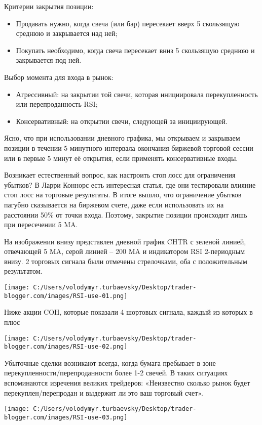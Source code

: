 \documentclass[a5paper]{article}
\begin{document}
Критерии закрытия позиции:
\begin{itemize}
\item     Продавать нужно, когда свеча (или бар) пересекает вверх 5 скользящую среднюю и закрывается над ней;
\item     Покупать необходимо, когда свеча пересекает вниз 5 скользящую среднюю и закрывается под ней.
\end{itemize}

Выбор момента для входа в рынок:
\begin{itemize}
\item     Агрессивный: на закрытии той свечи, которая инициировала перекупленность или перепроданность RSI;
\item     Консервативный: на открытии свечи, следующей за инициирующей.
\end{itemize}

Ясно, что при использовании дневного графика, мы открываем и закрываем позиции в течении 5 минутного интервала окончания биржевой торговой сессии или в первые 5 минут её открытия, если применять консервативные входы.

Возникает естественный вопрос, как настроить стоп лосс для ограничения убытков? В Ларри Коннорс есть интересная статья, где они тестировали влияние стоп лосс на торговые результаты. В итоге вышло, что ограничение убытков пагубно сказывается на биржевом счете, даже если использовать их на расстоянии 50\% от точки входа. Поэтому, закрытие позиции происходит лишь при пересечении 5 MA.

На изображении внизу представлен дневной график CHTR с зеленой линией,
отвечающей 5 MA, серой линией – 200 MA и индикатором RSI 2-периодным
внизу. 2 торговых сигнала были отмечены стрелочками, оба с
положительным результатом.

\texttt{[image: C:/Users/volodymyr.turbaevsky/Desktop/trader-blogger.com/images/RSI-use-01.png]}

Ниже акции COH, которые показали 4 шортовых сигнала, каждый из которых в плюс

\texttt{[image: C:/Users/volodymyr.turbaevsky/Desktop/trader-blogger.com/images/RSI-use-02.png]}

Убыточные сделки возникают всегда, когда бумага пребывает в зоне перекупленности/перепроданности более 1-2 свечей. В таких ситуациях вспоминаются изречения великих трейдеров: «Неизвестно сколько рынок будет перекуплен/перепродан и выдержит ли это ваш торговый счет».

\texttt{[image: C:/Users/volodymyr.turbaevsky/Desktop/trader-blogger.com/images/RSI-use-03.png]}
\end{document}
